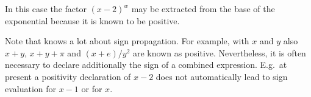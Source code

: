 In this case the factor $(x-2)^w$ may be extracted from the base
of the exponential because it is known to be positive.

Note that {\REDUCE} knows a lot about sign propagation.
For example, with $x$ and $y$ also $x+y$, $x+y+\pi$ and $(x+e)/y^2$
are known as positive.
Nevertheless, it is often necessary to declare additionally the sign of a 
combined expression. E.g.\ at present a positivity declaration of $x-2$ does not 
automatically lead to sign evaluation for $x-1$ or for $x$.

